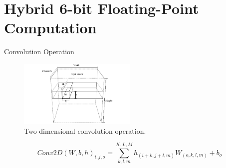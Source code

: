 \section{Hybrid 6-bit Floating-Point Computation}
\tableofcontents[currentsection]

\begin{frame}{Convolution Operation}
	\begin{figure}
		\centering
		\includegraphics[width=0.5\textwidth]{../figures/convolution.pdf}
		\caption{\scriptsize Two dimensional convolution operation.}
	\end{figure}
	
	
	{\scriptsize
		\[
Conv2D\left(W,b,h\right)_{i,j,o}=\sum_{k,l,m}^{K,L,M} h_{(i+k,j+l,m)} W_{(o,k,l,m)}+b_{o}
		\]
	}
\end{frame}

